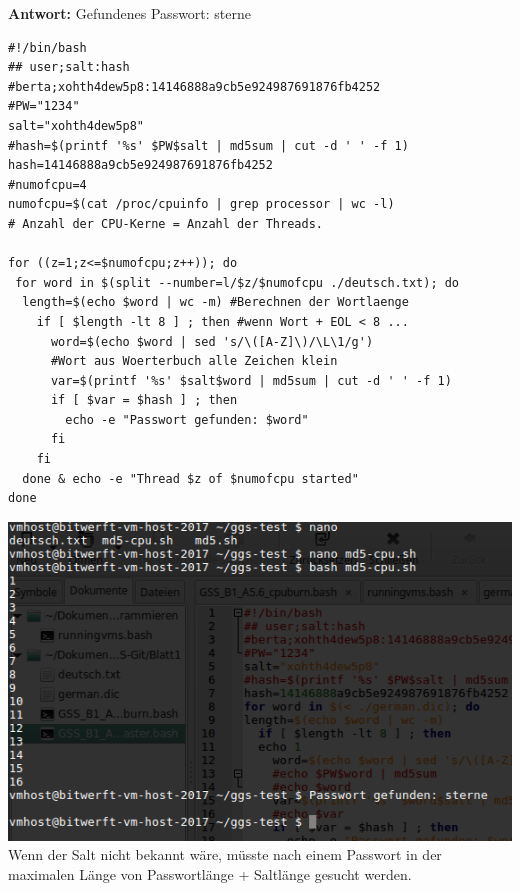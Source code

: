 \documentclass[ngerman]{fbi-aufgabenblatt}
\begin{document}
\textbf{Antwort:}
Gefundenes Passwort: sterne
\newpage
\begin{lstlisting}
#!/bin/bash
## user;salt:hash
#berta;xohth4dew5p8:14146888a9cb5e924987691876fb4252
#PW="1234"
salt="xohth4dew5p8"
#hash=$(printf '%s' $PW$salt | md5sum | cut -d ' ' -f 1)
hash=14146888a9cb5e924987691876fb4252
#numofcpu=4
numofcpu=$(cat /proc/cpuinfo | grep processor | wc -l) 
# Anzahl der CPU-Kerne = Anzahl der Threads.

for ((z=1;z<=$numofcpu;z++)); do
 for word in $(split --number=l/$z/$numofcpu ./deutsch.txt); do 
  length=$(echo $word | wc -m) #Berechnen der Wortlaenge
    if [ $length -lt 8 ] ; then #wenn Wort + EOL < 8 ...
      word=$(echo $word | sed 's/\([A-Z]\)/\L\1/g') 
      #Wort aus Woerterbuch alle Zeichen klein
      var=$(printf '%s' $salt$word | md5sum | cut -d ' ' -f 1)
      if [ $var = $hash ] ; then
        echo -e "Passwort gefunden: $word"
      fi
    fi
  done & echo -e "Thread $z of $numofcpu started"
done
\end{lstlisting}
\includegraphics[scale=0.95]{Passwortgefunden.png} \\
Wenn der Salt nicht bekannt wäre, müsste nach einem Passwort in der maximalen Länge von Passwortlänge + Saltlänge gesucht werden.
\end{document}
